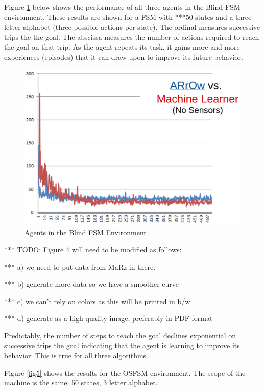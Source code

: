 \documentclass[letterpaper]{article} %
\begin{document}
Figure \ref{fig4} below shows the performance of all three agents in
the Blind FSM environment.  These results are shown for a FSM with
***50 states and a three-letter alphabet (three possible actions per
state).  The ordinal measures successive trips the the goal.  The
abscissa measures the number of actions required to reach the goal on
that trip.  As the agent repeats its task, it gains more and more
experiences (episodes) that it can draw upon to improve its future
behavior.

\begin{figure}[t]
  \centering
  \includegraphics[width=0.9\columnwidth]{BFSMResult.png} %
  \caption{Agents in the Blind FSM Environment}
  \label{fig4}
\end{figure}

*** TODO: Figure 4 will need to be modified as follows:

***    a) we need to put data from MaRz in there.

***    b) generate more data so we have a smoother curve

***    c) we can't rely on colors as this will be printed in b/w

***    d) generate as a high quality image, preferably in PDF format


Predictably, the number of steps to reach the goal declines
exponential on successive trips the goal indicating that the agent is
learning to improve its behavior.  This is true for all three
algorithms.

Figure \ref{fig5} shows the results for the OSFSM environment.  The scope of
the machine is the same: 50 states, 3 letter alphabet.  
\end{document}
